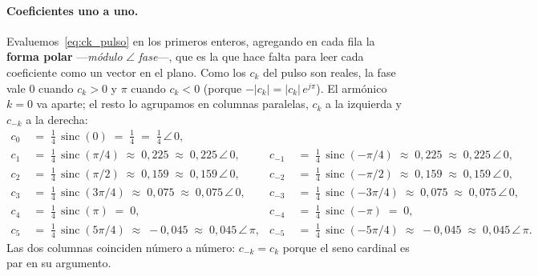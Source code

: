 \documentclass[class=book, crop=false]{standalone}
\begin{document}
\paragraph{Coeficientes uno a uno.}
Evaluemos~\eqref{eq:ck_pulso} en los primeros enteros, agregando
en cada fila la \textbf{forma polar} ---\emph{módulo} $\angle$
\emph{fase}---, que es la que hace falta para leer cada
coeficiente como un vector en el plano. Como los $c_k$ del pulso
son reales, la fase vale $0$ cuando $c_k > 0$ y $\pi$ cuando
$c_k < 0$ (porque $-|c_k| = |c_k|\,e^{j\pi}$). El armónico
$k=0$ va aparte; el resto lo agrupamos en columnas paralelas,
$c_k$ a la izquierda y $c_{-k}$ a la derecha:
\begin{align*}
    c_0  &\;=\; \tfrac{1}{4}\,\operatorname{sinc}(0)
                \;=\; \tfrac{1}{4}
                \;=\; \tfrac{1}{4}\,\angle\,0, \\[2pt]
    c_1  &\;=\; \tfrac{1}{4}\,\operatorname{sinc}(\pi/4)
                \;\approx\; 0{,}225
                \;\approx\; 0{,}225\,\angle\,0,
    & c_{-1} &\;=\; \tfrac{1}{4}\,\operatorname{sinc}(-\pi/4)
                \;\approx\; 0{,}225
                \;\approx\; 0{,}225\,\angle\,0, \\[2pt]
    c_2  &\;=\; \tfrac{1}{4}\,\operatorname{sinc}(\pi/2)
                \;\approx\; 0{,}159
                \;\approx\; 0{,}159\,\angle\,0,
    & c_{-2} &\;=\; \tfrac{1}{4}\,\operatorname{sinc}(-\pi/2)
                \;\approx\; 0{,}159
                \;\approx\; 0{,}159\,\angle\,0, \\[2pt]
    c_3  &\;=\; \tfrac{1}{4}\,\operatorname{sinc}(3\pi/4)
                \;\approx\; 0{,}075
                \;\approx\; 0{,}075\,\angle\,0,
    & c_{-3} &\;=\; \tfrac{1}{4}\,\operatorname{sinc}(-3\pi/4)
                \;\approx\; 0{,}075
                \;\approx\; 0{,}075\,\angle\,0, \\[2pt]
    c_4  &\;=\; \tfrac{1}{4}\,\operatorname{sinc}(\pi)
                \;=\; 0,
    & c_{-4} &\;=\; \tfrac{1}{4}\,\operatorname{sinc}(-\pi)
                \;=\; 0, \\[2pt]
    c_5  &\;=\; \tfrac{1}{4}\,\operatorname{sinc}(5\pi/4)
                \;\approx\; -0{,}045
                \;\approx\; 0{,}045\,\angle\,\pi,
    & c_{-5} &\;=\; \tfrac{1}{4}\,\operatorname{sinc}(-5\pi/4)
                \;\approx\; -0{,}045
                \;\approx\; 0{,}045\,\angle\,\pi.
\end{align*}
Las dos columnas coinciden número a número: $c_{-k} = c_k$
porque el seno cardinal es par en su argumento.
\end{document}
